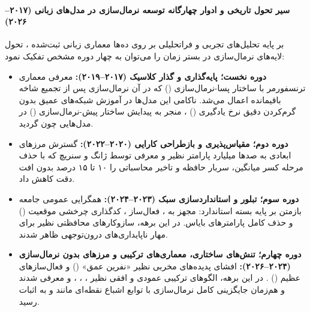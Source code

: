 \paragraph*{سیر تحول تاریخی و ادوار چهارگانه توسعه نرمال‌سازی در مدل‌های زبانی (۲۰۱۷–۲۰۲۶)}
بر پایه تحلیل‌های تجربی و فراتحلیلی بر روی ده‌ها معماری زبانی ثبت‌شده \cite{tan2025crystallization, octavia2025survey}، تحول لایه‌های نرمال‌سازی در بستر زمان را می‌توان به چهار دوره مشخص تفکیک نمود:
\begin{itemize}
    \item \textbf{دوره نخست؛ پایه‌گذاری و گذار کلاسیک (۲۰۱۷–۲۰۱۹):} معرفی معماری ترنسفورمر با ساختار پسا-نرمال‌سازی () \cite{vaswani2017attention} که در آن نرمال‌سازی پس از تجمیع شاخه باقیمانده اعمال می‌شد. ناکامی این مدل‌ها در آموزش شبکه‌های عمیق بدون گرم‌کردن دقیق نرخ یادگیری () \cite{liu2020understanding}، منجر به پیدایش ساختار پیش-نرمال‌سازی () در مدل‌هایی چون  \cite{radford2019language} گردید.
    \item \textbf{دوره دوم؛ مقیاس‌پذیری و بازطراحی کارایی (۲۰۲۰–۲۰۲۲):} گسترش مرزهای ابعادی به صدها میلیارد پارامتر نظیر  \cite{brown2020language} و معرفی  توسط ژانگ و سنریچ \cite{zhang2019root} که با حذف مرحله کسر میانگین، سربار حافظه و تاخیر محاسباتی را ۱۰ تا ۱۵ درصد بدون افت دقت کاهش داد.
    \item \textbf{دوره سوم؛ تبلور و استانداردسازی سبک  (۲۰۲۳–۲۰۲۴):} همگرایی عمومی جامعه بازمتن بر پایه بسته استاندارد:  مجهز به ، فعال‌ساز  \cite{shazeer2020glu}، کدگذاری چرخشی موقعیت () و حذف کامل پارامترهای بایاس. در این برهه، سازوکارهای محافظتی نظیر  \cite{henry2020query} برای مهار ناپایداری‌های درون‌توجهی ظاهر شدند.
    \item \textbf{دوره چهارم؛ تنش‌های ساختاری، معماری‌های ترکیبی و مرزهای بدون نرمال‌سازی (۲۰۲۴–۲۰۲۶):} افشای پدیده‌های مخربی نظیر «نفرین عمق» () \cite{sun2025curse, gromov2025unreasonable} و فعال‌سازهای عظیم () \cite{sun2024massive}. در این برهه، الگوهای ترکیبی عمودی و افقی نظیر  \cite{li2025mixln}،  \cite{kim2025periln}،  \cite{zhuo2025hybridnorm}،  \cite{chen2026keel} و  \cite{li2026siamesenorm} معرفی شدند و هم‌زمان جایگزینی کامل نرمال‌سازی با توابع اشباع نقطه‌ای مانند  \cite{zhu2025transformers} و  \cite{chen2026stronger} به اثبات رسید.
\end{itemize}


